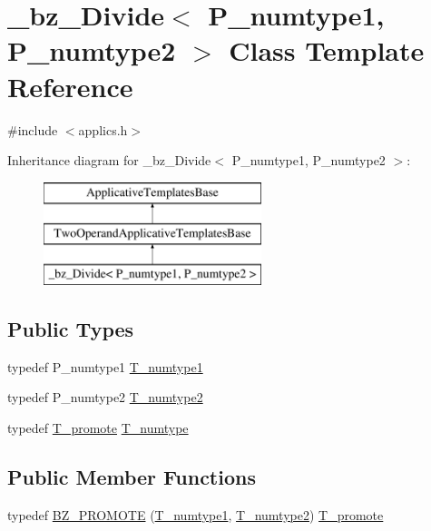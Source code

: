 \hypertarget{class__bz__Divide}{}\section{\+\_\+bz\+\_\+\+Divide$<$ P\+\_\+numtype1, P\+\_\+numtype2 $>$ Class Template Reference}
\label{class__bz__Divide}


{\ttfamily \#include $<$applics.\+h$>$}

Inheritance diagram for \+\_\+bz\+\_\+\+Divide$<$ P\+\_\+numtype1, P\+\_\+numtype2 $>$\+:\begin{figure}[H]
\begin{center}
\leavevmode
\includegraphics[height=3.000000cm]{class__bz__Divide}
\end{center}
\end{figure}
\subsection*{Public Types}
\begin{DoxyCompactItemize}
\item 
typedef P\+\_\+numtype1 \hyperlink{class__bz__Divide_a8008af03ab1e9e33041d7b37287d56e0}{T\+\_\+numtype1}
\item 
typedef P\+\_\+numtype2 \hyperlink{class__bz__Divide_a1925bff658537c3ad20c9f107cc1fb72}{T\+\_\+numtype2}
\item 
typedef \hyperlink{minmax_8h_aaa88a440c2f0d00798d5b1d42c79308d}{T\+\_\+promote} \hyperlink{class__bz__Divide_acc1b7662baf0aaf8ef894ea02943e417}{T\+\_\+numtype}
\end{DoxyCompactItemize}
\subsection*{Public Member Functions}
\begin{DoxyCompactItemize}
\item 
typedef \hyperlink{class__bz__Divide_a65582d2c1bc5142741b2e6a4bd00c799}{B\+Z\+\_\+\+P\+R\+O\+M\+O\+T\+E} (\hyperlink{class__bz__Divide_a8008af03ab1e9e33041d7b37287d56e0}{T\+\_\+numtype1}, \hyperlink{class__bz__Divide_a1925bff658537c3ad20c9f107cc1fb72}{T\+\_\+numtype2}) \hyperlink{minmax_8h_aaa88a440c2f0d00798d5b1d42c79308d}{T\+\_\+promote}
\end{DoxyCompactItemize}
